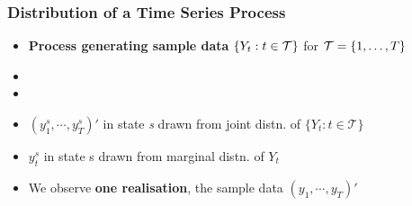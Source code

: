 \documentclass{beamer}
\begin{document}
		\begin{frame}
			\frametitle{Distribution of a Time Series Process}
			\begin{itemize}
				
				\item[] \normalsize  \hspace{-5pt}\textbf{ \large Process generating sample data} $\large \{Y_{t} : t \in \mathcal{T}\} $ for $\large\mathcal{T}=\{1,\hdots, T\}$	
				\pause
				\vspace{20pt}
				\item[]
				
				\pause
				\vspace{20pt}
				
				\item[]
				
				\pause
				\vspace{30pt}
				\large
				\item[]  $(y_1^s,\cdots,y_T^s)'$ in state \textit{s} drawn from  joint distn. of $\{Y_{t} : t \in \mathcal{T}\}$
				\pause
				\vspace{12pt}
				\item[] $y_t^s$ in state s drawn from marginal distn. of $Y_t$
				\vspace{18pt}
				\pause
				\item[] We observe \textbf{one realisation}, the sample data  $(y_1,\cdots, y_T)'$
			\end{itemize}
			
			
			
		\end{frame}
		
		
		
\end{document}
